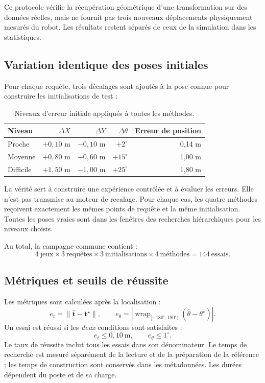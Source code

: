 \documentclass[11pt,a4paper]{article}
\begin{document}
Ce protocole vérifie la récupération géométrique d'une transformation sur
des données réelles, mais ne fournit pas trois nouveaux déplacements
physiquement mesurés du robot. Les résultats restent séparés de ceux de
la simulation dans les statistiques.

\subsection{Variation identique des poses initiales}
Pour chaque requête, trois décalages sont ajoutés à la pose connue pour
construire les initialisations de test :
\begin{table}[h]
\centering
\caption{Niveaux d'erreur initiale appliqués à toutes les méthodes.}
\begin{tabular}{lrrrr}
\toprule
Niveau & $\Delta X$ & $\Delta Y$ & $\Delta\theta$ & Erreur de position \\
\midrule
Proche & $+0,10$ m & $-0,10$ m & $+2^\circ$ & 0,14 m \\
Moyenne & $+0,80$ m & $-0,60$ m & $+15^\circ$ & 1,00 m \\
Difficile & $+1,50$ m & $-1,00$ m & $+25^\circ$ & 1,80 m \\
\bottomrule
\end{tabular}
\end{table}

La vérité sert à construire une expérience contrôlée et à évaluer les
erreurs. Elle n'est pas transmise au moteur de recalage. Pour chaque cas,
les quatre méthodes reçoivent exactement les mêmes points de requête
et la même initialisation. Toutes les poses vraies sont dans les fenêtres
des recherches hiérarchiques pour les niveaux choisis.

Au total, la campagne commune contient :
\[
 4\ \text{jeux}\times3\ \text{requêtes}\times
 3\ \text{initialisations}\times4\ \text{méthodes}
 =\boxed{144\ \text{essais}}.
\]

\subsection{Métriques et seuils de réussite}
Les métriques sont calculées après la localisation :
\[
 e_t=\|\widehat{\mathbf t}-\mathbf t^\star\|,\qquad
 e_\theta=
 \left|\operatorname{wrap}_{[-180^\circ,180^\circ)}
 \left(\widehat{\theta}-\theta^\star\right)\right|.
\]
Un essai est réussi si les \emph{deux} conditions sont satisfaites :
\[
 e_t\leq0{,}10\ \mathrm m,\qquad e_\theta\leq1^\circ.
\]
Le taux de réussite inclut tous les essais dans son dénominateur.
Le temps de recherche est mesuré séparément de la lecture et de la
préparation de la référence ; les temps de construction sont conservés
dans les métadonnées. Les durées dépendent du poste et de sa charge.
\end{document}
